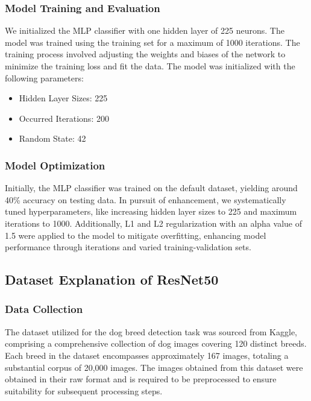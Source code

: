\subsubsection{Model Training and Evaluation}
We initialized the MLP classifier with one hidden layer of 225 neurons. The model was trained using the training set for a maximum of 1000 iterations. The training process involved adjusting the weights and biases of the network to minimize the training loss and fit the data. The model was initialized with the following parameters:
\begin{itemize}
    \item Hidden Layer Sizes: 225
    \item Occurred Iterations: 200
    \item Random State: 42
\end{itemize}
\subsubsection{Model Optimization}
Initially, the MLP classifier was trained on the default dataset, yielding around 40\% accuracy on testing data. In pursuit of enhancement, we systematically tuned hyperparameters, like increasing hidden layer sizes to 225 and maximum iterations to 1000. Additionally, L1 and L2 regularization with an alpha value of 1.5 were applied to the model to mitigate overfitting, enhancing model
performance through iterations and varied training-validation sets.

\subsection{Dataset Explanation of ResNet50}
\subsubsection{Data Collection}
The dataset utilized for the dog breed detection task was sourced from Kaggle, comprising a comprehensive collection of dog images covering 120 distinct breeds. Each breed in the dataset encompasses approximately 167 images, totaling a substantial corpus of 20,000 images. The images obtained from this dataset were obtained in their raw format and is required to be preprocessed to ensure suitability for subsequent processing steps.


